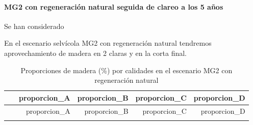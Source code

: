 \documentclass[]{article}
\let\oldparagraph\paragraph
\renewcommand{\paragraph}[1]{\oldparagraph{#1}\mbox{}}
\begin{document}
\paragraph{MG2 con regeneración natural seguida de clareo a los 5
años}\label{mg2-con-regeneraciuxf3n-natural-seguida-de-clareo-a-los-5-auxf1os}

Se han considerado

En el escenario selvícola MG2 con regeneración natural tendremos
aprovechamiento de madera en 2 claras y en la corta final.

\begin{longtable}[]{@{}lrrrr@{}}
\caption{Proporciones de madera (\%) por calidades en el escenario MG2
con regeneración natural}\tabularnewline
\toprule
\begin{minipage}[b]{0.25\columnwidth}\raggedright\strut
~\strut
\end{minipage} & \begin{minipage}[b]{0.15\columnwidth}\raggedleft\strut
proporcion\_A\strut
\end{minipage} & \begin{minipage}[b]{0.15\columnwidth}\raggedleft\strut
proporcion\_B\strut
\end{minipage} & \begin{minipage}[b]{0.15\columnwidth}\raggedleft\strut
proporcion\_C\strut
\end{minipage} & \begin{minipage}[b]{0.15\columnwidth}\raggedleft\strut
proporcion\_D\strut
\end{minipage}\tabularnewline
\midrule
\endfirsthead
\toprule
\begin{minipage}[b]{0.25\columnwidth}\raggedright\strut
~\strut
\end{minipage} & \begin{minipage}[b]{0.15\columnwidth}\raggedleft\strut
proporcion\_A\strut
\end{minipage} & \begin{minipage}[b]{0.15\columnwidth}\raggedleft\strut
proporcion\_B\strut
\end{minipage} & \begin{minipage}[b]{0.15\columnwidth}\raggedleft\strut
proporcion\_C\strut
\end{minipage} & \begin{minipage}[b]{0.15\columnwidth}\raggedleft\strut
proporcion\_D\strut
\end{minipage}\tabularnewline
\midrule
\endhead
\begin{minipage}[t]{0.25\columnwidth}\raggedright\strut

\end{minipage}
\end{longtable}
\end{document}
